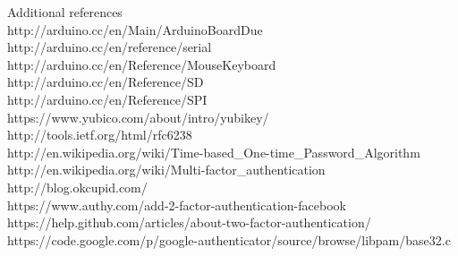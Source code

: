 \documentclass[conference]{IEEEtran}
\begin{document}
Additional references \\
http://arduino.cc/en/Main/ArduinoBoardDue \\
http://arduino.cc/en/reference/serial \\
http://arduino.cc/en/Reference/MouseKeyboard \\
http://arduino.cc/en/Reference/SD \\
http://arduino.cc/en/Reference/SPI \\
https://www.yubico.com/about/intro/yubikey/ \\
http://tools.ietf.org/html/rfc6238 \\
http://en.wikipedia.org/wiki/Time-based\_One-time\_Password\_Algorithm \\
http://en.wikipedia.org/wiki/Multi-factor\_authentication \\
http://blog.okcupid.com/ \\
https://www.authy.com/add-2-factor-authentication-facebook \\
https://help.github.com/articles/about-two-factor-authentication/ \\
https://code.google.com/p/google-authenticator/source/browse/libpam/base32.c \\





%
%
%


\end{document}
